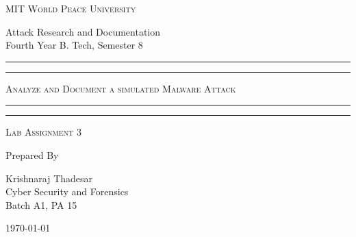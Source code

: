 \documentclass[11pt]{article}
\begin{document}
\begin{titlepage}
	\centering


	\huge\textsc{
		MIT World Peace University
	}\\

	\vspace{0.75\baselineskip} %

	\LARGE{
		Attack Research and Documentation\\
		Fourth Year B. Tech, Semester 8
	}

	\vfill %


	\rule{\textwidth}{1.6pt}\vspace*{-\baselineskip}\vspace*{2pt}
	\rule{\textwidth}{0.6pt}
	\vspace{0.75\baselineskip} %

	\huge{\textsc{
        Analyze and Document a simulated Malware Attack
        }} \\

	\vspace{0.5\baselineskip} %
	\rule{\textwidth}{0.6pt}\vspace*{-\baselineskip}\vspace*{2.8pt}
	\rule{\textwidth}{1.6pt}

	\vspace{1\baselineskip} %


	\LARGE\textsc{
		Lab Assignment 3
	} %
	\vfill


	Prepared By \vspace{0.5\baselineskip} %

	\Large{
		Krishnaraj Thadesar \\
		Cyber Security and Forensics\\
        Batch A1, PA 15
	}

	\vspace{0.5\baselineskip} %
	\today

\end{titlepage}
\end{document}
